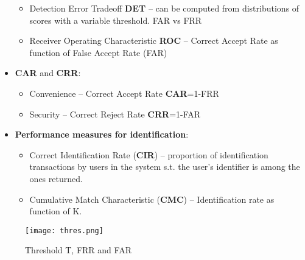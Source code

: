 \documentclass[a4paper]{article}
\begin{document}
\begin{itemize}
        \begin{itemize}
          \item Detection Error Tradeoff \textbf{DET} -- can be computed from distributions of scores with a variable threshold. FAR vs FRR
          \item Receiver Operating Characteristic \textbf{ROC} -- Correct Accept Rate as function of False Accept Rate (FAR)
        \end{itemize}
        \item \textbf{CAR} and \textbf{CRR}:
        \begin{itemize}
          \item Convenience -- Correct Accept Rate \textbf{CAR}=1-FRR
          \item Security -- Correct Reject Rate \textbf{CRR}=1-FAR
        \end{itemize}
        \item \textbf{Performance measures for identification}:
        \begin{itemize}
          \item Correct Identification Rate (\textbf{CIR}) -- proportion of identification transactions by users in the system s.t. the user's identifier is among the ones returned.
          \item Cumulative Match Characteristic (\textbf{CMC}) -- Identification rate as function of K.
        \end{itemize}
      \end{itemize}
      \begin{figure}[htp]
        \centering
          \texttt{[image: thres.png]}
          \caption{Threshold T, FRR and FAR}
          \label{fig:frrfar}
      \end{figure}
\end{document}
